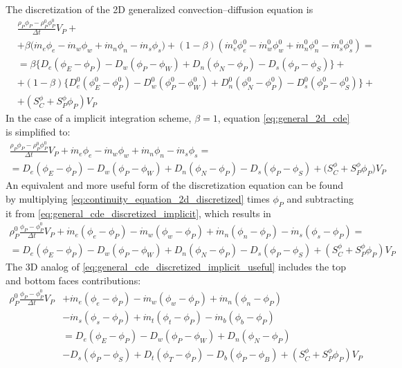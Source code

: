 The discretization of the 2D generalized convection--diffusion equation is
\begin{align}
	&\frac{\rho_P \phi_P - \rho_P^0 \phi_P^0}{\Delta t} V_P + \nonumber \\
	&+ 
	\beta 
	\Big( \dot{m}_e \phi_e - \dot{m}_w \phi_w + \dot{m}_n \phi_n - \dot{m}_s \phi_s \Big) + 
	(1 - \beta) 
	\left( \dot{m}_e^0 \phi_e^0 - \dot{m}_w^0 \phi_w^0 + \dot{m}_n^0 \phi_n^0 - \dot{m}_s^0 \phi_s^0 \right) =  \nonumber \\
	&= 
	\beta 
	\Big\{ 
	D_e (\phi_E - \phi_P) - D_w (\phi_P - \phi_W) + D_n (\phi_N - \phi_P) - D_s (\phi_P - \phi_S) 
	\Big\} + \nonumber \\
	&+ (1 - \beta)
	\Big\{ 
	D_e^0 (\phi_E^0 - \phi_P^0) - D_w^0 (\phi_P^0 - \phi_W^0) + 
	D_n^0 (\phi_N^0 - \phi_P^0) - D_s^0 (\phi_P^0 - \phi_S^0)
	\Big\} + \nonumber \\
	&+ \left( S_C^\phi + S_P^\phi \phi_P \right) V_P \label{eq:general_2d_cde}
\end{align}
In the case of a implicit integration scheme, \ie $\beta = 1$, equation
\eqref{eq:general_2d_cde} is simplified to:
\begin{multline} \label{eq:general_cde_discretized_implicit}
	\frac{\rho_P \phi_P - \rho_P^0 \phi_P^0}{\Delta t} V_P + 
	\dot{m}_e \phi_e - \dot{m}_w \phi_w + \dot{m}_n \phi_n - \dot{m}_s \phi_s = \\ = 
	D_e (\phi_E - \phi_P) - D_w (\phi_P - \phi_W) + D_n (\phi_N - \phi_P) - D_s (\phi_P - \phi_S) +
	\big( S_C^\phi + S_P^\phi \phi_P \big) V_P
\end{multline}
An equivalent and more useful form of the discretization equation can be found
by multiplying \eqref{eq:continuity_equation_2d_discretized} times $\phi_P$ and
subtracting it from \eqref{eq:general_cde_discretized_implicit}, which results
in
\begin{multline} \label{eq:general_cde_discretized_implicit_useful}
	\rho_P^0 \frac{\phi_P - \phi_P^0}{\Delta t} V_P
	+ \dot{m}_e (\phi_e - \phi_P) - \dot{m}_w (\phi_w - \phi_P) 
	+ \dot{m}_n (\phi_n - \phi_P) - \dot{m}_s (\phi_s - \phi_P) 
	= \\
	= D_e (\phi_E - \phi_P) - D_w (\phi_P - \phi_W)
	+ D_n (\phi_N - \phi_P) - D_s (\phi_P - \phi_S)
	+ (S_C^\phi + S_P^\phi \phi_P) V_P
\end{multline}
The 3D analog of \eqref{eq:general_cde_discretized_implicit_useful} includes the
top and bottom faces contributions:
\begin{align} \label{eq:general_cde_discretized_implicit_useful_3d}
	\rho_P^0 \frac{\phi_P - \phi_P^0}{\Delta t} V_P
	&+ \dot{m}_e (\phi_e - \phi_P) - \dot{m}_w (\phi_w - \phi_P)  + \dot{m}_n (\phi_n - \phi_P) 
	\nonumber \\
	&- \dot{m}_s (\phi_s - \phi_P) + \dot{m}_t (\phi_t - \phi_P) - \dot{m}_b (\phi_b - \phi_P) 
	\nonumber \\
	&= D_e (\phi_E - \phi_P) - D_w (\phi_P - \phi_W) + D_n (\phi_N - \phi_P) 
	\nonumber \\
	&- D_s (\phi_P - \phi_S) + D_t (\phi_T - \phi_P) - D_b (\phi_P - \phi_B) + (S_C^\phi + S_P^\phi \phi_P) V_P
\end{align}

